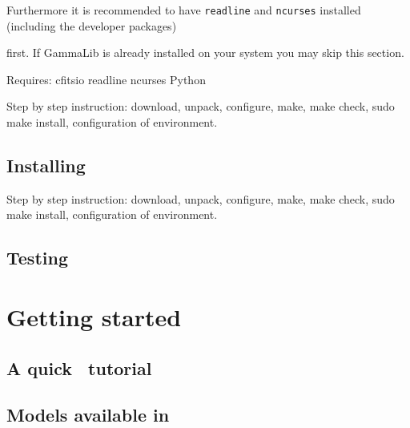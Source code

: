\documentclass{article}[12pt,a4]
\begin{document}
Furthermore it is recommended to have {\tt readline} and {\tt ncurses} installed (including the
developer packages)


first.
If GammaLib is already installed on your system you may skip this section.

Requires:
cfitsio
readline
ncurses
Python

Step by step instruction:
download,
unpack,
configure,
make,
make check,
sudo make install,
configuration of environment.


\subsection{Installing \this}
\label{sec:ctools}

Step by step instruction:
download,
unpack,
configure,
make,
make check,
sudo make install,
configuration of environment.


\subsection{Testing \this}


%
\section{Getting started}

\subsection{A quick \this\ tutorial}

\subsection{Models available in \this}
\end{document}
